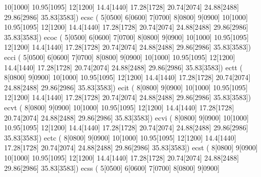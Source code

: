 {                          10[1000] 10.95[1095] 12[1200] 14.4[1440] 
                          17.28[1728] 20.74[2074] 24.88[2488] 29.86[2986] 
                          35.83[3583])
     \makefont ecsc   ( 5[0500] 6[0600] 7[0700] 8[0800] 9[0900] 
                          10[1000] 10.95[1095] 12[1200] 14.4[1440] 
                          17.28[1728] 20.74[2074] 24.88[2488] 29.86[2986] 
                          35.83[3583])
     \makefont ecoc   ( 5[0500] 6[0600] 7[0700] 8[0800] 9[0900] 
                          10[1000] 10.95[1095] 12[1200] 14.4[1440] 
                          17.28[1728] 20.74[2074] 24.88[2488] 29.86[2986] 
                          35.83[3583])
     \makefont ecci   ( 5[0500] 6[0600] 7[0700] 8[0800] 9[0900] 
                          10[1000] 10.95[1095] 12[1200] 14.4[1440] 
                          17.28[1728] 20.74[2074] 24.88[2488] 29.86[2986]
                          35.83[3583])
     \makefont ectt   (%
                          8[0800] 9[0900] 
                          10[1000] 10.95[1095] 12[1200] 14.4[1440] 
                          17.28[1728] 20.74[2074] 24.88[2488] 29.86[2986]
                          35.83[3583])
     \makefont ecit   (%
                          8[0800] 9[0900] 
                          10[1000] 10.95[1095] 12[1200] 14.4[1440] 
                          17.28[1728] 20.74[2074] 24.88[2488] 29.86[2986]
                          35.83[3583])
     \makefont ecvt   (%
                          8[0800] 9[0900] 
                          10[1000] 10.95[1095] 12[1200] 14.4[1440] 
                          17.28[1728] 20.74[2074] 24.88[2488] 29.86[2986]
                          35.83[3583])
     \makefont ecvi   (%
                          8[0800] 9[0900] 
                          10[1000] 10.95[1095] 12[1200] 14.4[1440] 
                          17.28[1728] 20.74[2074] 24.88[2488] 29.86[2986]
                          35.83[3583])
     \makefont ectc   (%
                          8[0800] 9[0900] 
                          10[1000] 10.95[1095] 12[1200] 14.4[1440] 
                          17.28[1728] 20.74[2074] 24.88[2488] 29.86[2986]
                          35.83[3583])
     \makefont ecst   (%
                          8[0800] 9[0900] 
                          10[1000] 10.95[1095] 12[1200] 14.4[1440] 
                          17.28[1728] 20.74[2074] 24.88[2488] 29.86[2986]
                          35.83[3583])
     \makefont ecss   ( 5[0500] 6[0600] 7[0700] 8[0800] 9[0900] 
}
